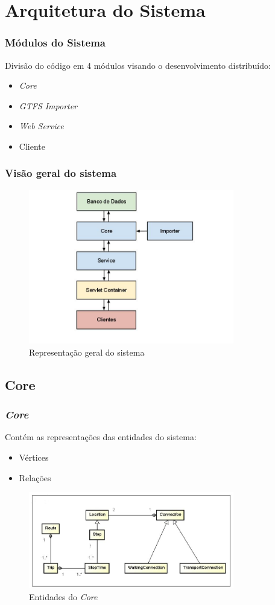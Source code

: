 \section{Arquitetura do Sistema}
\frame
{
\frametitle{Módulos do Sistema}
Divisão do código em 4 módulos visando o desenvolvimento distribuído:
\begin{itemize}
\item \emph{Core}
\item \emph{GTFS Importer}
\item \emph{Web Service}
\item Cliente
\end{itemize}
}

\frame
{
\frametitle{Visão geral do sistema}
\begin{figure}
\includegraphics[width=0.8\textwidth]{./imgs/arquitetura.png}
\caption{Representação geral do sistema}
\end{figure}

}

\subsection{Core}
\frame
{
\frametitle{\emph{Core}}
Contém as representações das entidades do sistema:
\begin{itemize}
\item Vértices
\item Relações
\end{itemize}
\begin{figure}
\includegraphics[width=0.8\textwidth]{./imgs/CoreDiagram.png}
\caption{Entidades do \emph{Core}}
\end{figure}

}

